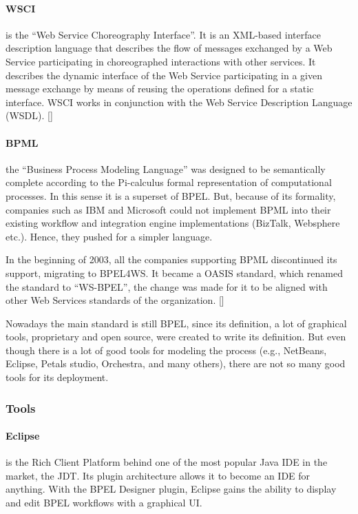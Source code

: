 \paragraph{WSCI}
is the ``Web Service Choreography Interface''. It is an XML-based interface description language that describes the flow of messages exchanged by a Web Service participating in choreographed interactions with other services. It describes the dynamic interface of the Web Service participating in a given message exchange by means of reusing the operations defined for a static interface. WSCI works in conjunction with the Web Service Description Language (WSDL). [\citet{WSCI}]

\paragraph{BPML} 
the ``Business Process Modeling Language'' was designed to be semantically complete according to the Pi-calculus formal representation of computational processes. In this sense it is a superset of BPEL. But, because of its formality, companies such as IBM and Microsoft could not implement BPML into their existing workflow and integration engine implementations (BizTalk, Websphere etc.). Hence, they pushed for a simpler language.

In the beginning of 2003, all the companies supporting BPML discontinued its support, migrating to BPEL4WS. It became a OASIS standard, which renamed the standard to ``WS-BPEL'', the change was made for it to be aligned with other Web Services standards of the organization. [\citet{OASIS}]

Nowadays the main standard is still BPEL, since its definition, a lot of graphical tools, proprietary and open source, were created to write its definition. But even though there is a lot of good tools for modeling the process (e.g., NetBeans, Eclipse, Petals studio, Orchestra, and many others), there are not so many good tools for its deployment.

\subsubsection{Tools}

\paragraph{Eclipse}
is the Rich Client Platform behind one of the most popular Java IDE in the market, the JDT. Its plugin architecture allows it to become an IDE for anything. With the BPEL Designer plugin, Eclipse gains the ability to display and edit BPEL workflows with a graphical UI.

